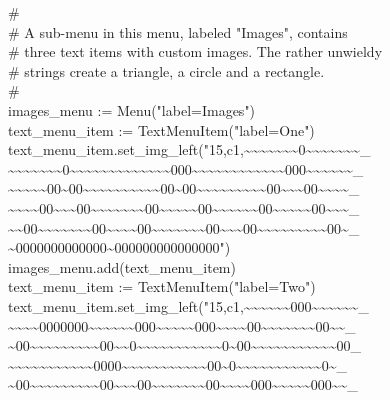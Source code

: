{\>\>\# \\
\>\>\# A sub-menu in this menu, labeled "Images", contains \\
\>\>\# three text items with custom images. The rather unwieldy \\
\>\>\# strings create a triangle, a circle and a rectangle. \\
\>\>\# \\
\>\>images\_menu := Menu("label=Images") \\
\>\>text\_menu\_item := TextMenuItem("label=One") \\
\>\>text\_menu\_item.set\_img\_left("15,c1,\~{}\~{}\~{}\~{}\~{}\~{}\~{}0\~{}\~{}\~{}\~{}\~{}\~{}\~{}\_ \\
\>\>\~{}\~{}\~{}\~{}\~{}\~{}\~{}0\~{}\~{}\~{}\~{}\~{}\~{}\~{}\~{}\~{}\~{}\~{}\~{}\~{}000\~{}\~{}\~{}\~{}\~{}\~{}\~{}\~{}\~{}\~{}\~{}\~{}000\~{}\~{}\~{}\~{}\~{}\~{}\_ \\
\>\>\~{}\~{}\~{}\~{}\~{}00\~{}00\~{}\~{}\~{}\~{}\~{}\~{}\~{}\~{}\~{}\~{}00\~{}00\~{}\~{}\~{}\~{}\~{}\~{}\~{}\~{}\~{}00\~{}\~{}\~{}00\~{}\~{}\~{}\~{}\_ \\
\>\>\~{}\~{}\~{}\~{}00\~{}\~{}\~{}00\~{}\~{}\~{}\~{}\~{}\~{}\~{}00\~{}\~{}\~{}\~{}\~{}00\~{}\~{}\~{}\~{}\~{}\~{}00\~{}\~{}\~{}\~{}\~{}00\~{}\~{}\~{}\_ \\
\>\>\~{}\~{}00\~{}\~{}\~{}\~{}\~{}\~{}\~{}00\~{}\~{}\~{}\~{}00\~{}\~{}\~{}\~{}\~{}\~{}\~{}00\~{}\~{}\~{}00\~{}\~{}\~{}\~{}\~{}\~{}\~{}\~{}\~{}00\~{}\_ \\
\>\>\~{}0000000000000\~{}000000000000000") \\
\>\>images\_menu.add(text\_menu\_item) \\
\>\>text\_menu\_item := TextMenuItem("label=Two") \\
\>\>text\_menu\_item.set\_img\_left("15,c1,\~{}\~{}\~{}\~{}\~{}\~{}000\~{}\~{}\~{}\~{}\~{}\~{}\_ \\
\>\>\~{}\~{}\~{}\~{}0000000\~{}\~{}\~{}\~{}\~{}\~{}000\~{}\~{}\~{}\~{}\~{}000\~{}\~{}\~{}\~{}00\~{}\~{}\~{}\~{}\~{}\~{}\~{}00\~{}\~{}\_ \\
\>\>\~{}00\~{}\~{}\~{}\~{}\~{}\~{}\~{}\~{}\~{}00\~{}\~{}0\~{}\~{}\~{}\~{}\~{}\~{}\~{}\~{}\~{}\~{}\~{}0\~{}00\~{}\~{}\~{}\~{}\~{}\~{}\~{}\~{}\~{}\~{}\~{}00\_ \\
\>\~{}\~{}\~{}\~{}\~{}\~{}\~{}\~{}\~{}\~{}\~{}0000\~{}\~{}\~{}\~{}\~{}\~{}\~{}\~{}\~{}\~{}\~{}00\~{}0\~{}\~{}\~{}\~{}\~{}\~{}\~{}\~{}\~{}\~{}\~{}0\~{}\_ \\
\>\>\~{}00\~{}\~{}\~{}\~{}\~{}\~{}\~{}\~{}\~{}00\~{}\~{}\~{}00\~{}\~{}\~{}\~{}\~{}\~{}\~{}00\~{}\~{}\~{}\~{}000\~{}\~{}\~{}\~{}\~{}000\~{}\~{}\_ \\
}

